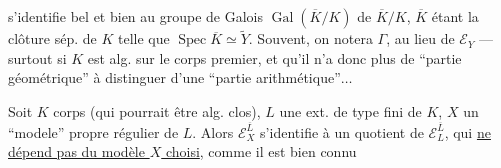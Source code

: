 
s'identifie bel et bien au groupe
de Galois $\operatorname{Gal}(\overline K/K)$ de  $\overline K/K$,
$\overline K$ étant la clôture sép. de $K$ telle que
$\operatorname{Spec}\overline K\simeq\widetilde Y$. Souvent, on notera
$\Gamma$,  au lieu de $\mathcal E_Y$ --- surtout
si $K$ est alg. sur le corps premier,
et qu'il n'a donc plus de ``partie
géométrique'' à distinguer d'une
``partie arithmétique''$\ldots$

Soit  $K$  corps (qui pourrait
être alg. clos), $L$ une ext. de
type fini de $K$, $X$ un ``modele''
propre régulier de $L$. Alors
$\mathcal E_X^{\overline L}$ s'identifie à un quotient de $\mathcal E_L^{\overline L}$,
qui \uline{ne  dépend pas du modèle
$X$ choisi}, comme il est bien connu


